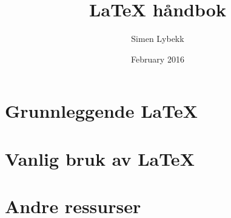 \documentclass{article}
\author{Simen Lybekk}
\title{LaTeX håndbok}
\date{February 2016}
\begin{document}
\maketitle

\tableofcontents
\clearpage


\section{Grunnleggende LaTeX}


\section{Vanlig bruk av LaTeX}




\section{Andre ressurser}



\end{document}
